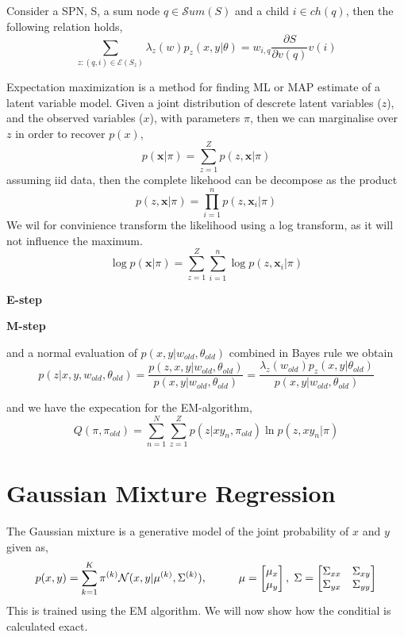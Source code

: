 \begin{proposition}
    Consider a SPN, S, a sum node $q \in \mathcal{S}um(S)$ and a child $i \in ch(q)$,
    then the following relation holds, 
    $$\sum_{z:(q,i)\in \mathcal{E}(S_z)} \lambda_z(w) p_z(x,y|\theta) = w_{i,q}
    \frac{\partial S}{\partial v(q)} v(i)$$
\end{proposition}


\begin{testexample2}
    Expectation maximization is a method for finding ML or MAP estimate of a 
    latent variable model. Given a joint distribution of descrete latent variables ($z$),
    and the observed variables ($x$), with parameters $\pi$, then we can marginalise over
    $z$ in order to recover $p(x)$, 
    $$p(\textbf{x}|\pi) = \sum_{z=1}^Z p(z,\textbf{x}|\pi) $$
    assuming iid data, then the complete likehood can be decompose as the product 
    $$ p(z,\textbf{x}|\pi) = \prod_{i=1}^n p(z,\textbf{x}_i|\pi)$$
    We wil for convinience transform the likelihood using a log transform, 
    as it will not influence the maximum. 
    $$\log p(\textbf{x}|\pi) = \sum_{z=1}^Z \sum_{i=1}^n \log p(z,\textbf{x}_i|\pi)$$

    \textbf{E-step}

    \textbf{M-step}
\end{testexample2}


and a normal evaluation of $p(x,y|w_{old}, \theta_{old})$
combined in Bayes rule we obtain
$$p(z|x,y,w_{old},\theta_{old}) = \frac{p(z,x,y|w_{old},\theta_{old})}{p(x,y|w_{old}, \theta_{old})} =
 \frac{\lambda_z(w_{old})p_z(x,y|\theta_{old})}{p(x,y|w_{old}, \theta_{old})} $$

and we have the expecation for the EM-algorithm, 
$$Q(\pi, \pi_{old}) = \sum_{n=1}^N \sum_{z=1}^Z p(z|xy_n, \pi_{old}) \ln p(z,xy_n|\pi)$$



\section{Gaussian Mixture Regression}
The Gaussian mixture is a generative model of the joint probability of $x$ and $y$ given as, 
$$p(x,y)= \sum_{k=1}^K \pi^{(k)} \mathcal{N}(x,y|\mu^{(k)},\Sigma^{(k)}), 
\hspace{1cm} \mu=\begin{bmatrix}
    \mu_x \\ \mu_y
\end{bmatrix},\hspace{0.1cm} \Sigma = \begin{bmatrix}
    \Sigma_{xx} & \Sigma_{xy}\\ \Sigma_{yx}& \Sigma_{yy}
\end{bmatrix}$$
This is trained using the EM algorithm. We will now show how the conditial is
calculated exact. 

